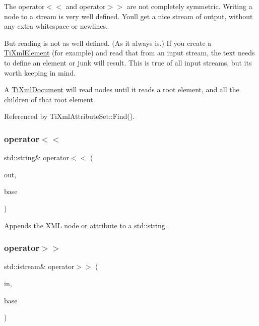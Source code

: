 The operator$<$$<$ and operator$>$$>$ are not completely symmetric. Writing a node to a stream is very well defined. You\textquotesingle{}ll get a nice stream of output, without any extra whitespace or newlines.

But reading is not as well defined. (As it always is.) If you create a \hyperlink{class_ti_xml_element}{Ti\+Xml\+Element} (for example) and read that from an input stream, the text needs to define an element or junk will result. This is true of all input streams, but it\textquotesingle{}s worth keeping in mind.

A \hyperlink{class_ti_xml_document}{Ti\+Xml\+Document} will read nodes until it reads a root element, and all the children of that root element. 

Referenced by Ti\+Xml\+Attribute\+Set\+::\+Find().

\hypertarget{class_ti_xml_node_a52ef17e7080df2490cf87bde380685ab}{}\label{class_ti_xml_node_a52ef17e7080df2490cf87bde380685ab} 
\subsubsection{\texorpdfstring{operator$<$$<$}{operator<<}\hspace{0.1cm}{\footnotesize\ttfamily [2/2]}}
{\footnotesize\ttfamily std\+::string\& operator$<$$<$ (\begin{DoxyParamCaption}\item[{std\+::string \&}]{out,  }\item[{const \hyperlink{class_ti_xml_node}{Ti\+Xml\+Node} \&}]{base }\end{DoxyParamCaption})\hspace{0.3cm}{\ttfamily [friend]}}



Appends the X\+ML node or attribute to a std\+::string. 

\hypertarget{class_ti_xml_node_ab57bd426563c926844f65a78412e18b9}{}\label{class_ti_xml_node_ab57bd426563c926844f65a78412e18b9} 
\subsubsection{\texorpdfstring{operator$>$$>$}{operator>>}}
{\footnotesize\ttfamily std\+::istream\& operator$>$$>$ (\begin{DoxyParamCaption}\item[{std\+::istream \&}]{in,  }\item[{\hyperlink{class_ti_xml_node}{Ti\+Xml\+Node} \&}]{base }\end{DoxyParamCaption})\hspace{0.3cm}{\ttfamily [friend]}}

